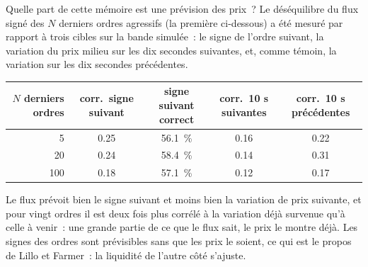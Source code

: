 Quelle part de cette mémoire est une prévision des prix~? Le déséquilibre du flux signé des $N$ derniers ordres agressifs (la première  ci-dessous) a été
mesuré par rapport à trois cibles sur la bande simulée~: le signe de l'ordre suivant, la variation du prix milieu sur les dix secondes suivantes, et, comme
témoin, la variation sur les dix secondes précédentes.

\begin{center}
\small
\begin{tabular}{@{}rcccc@{}}
\toprule
$N$ derniers ordres & corr.\ signe suivant & signe suivant correct & corr.\ 10 s suivantes & corr.\ 10 s précédentes\\
\midrule
5 & 0.25 & 56.1~\% & 0.16 & 0.22\\
20 & 0.24 & 58.4~\% & 0.14 & 0.31\\
100 & 0.18 & 57.1~\% & 0.12 & 0.17\\
\bottomrule
\end{tabular}
\end{center}

Le flux prévoit bien le signe suivant et moins bien la variation de prix suivante, et pour vingt ordres il est deux fois plus corrélé à la
variation déjà survenue qu'à celle à venir~: une grande partie de ce que le flux sait, le prix le montre déjà. Les signes des ordres sont
prévisibles sans que les prix le soient, ce qui est le propos de Lillo et Farmer~: la liquidité de l'autre côté s'ajuste.

\begin{omfigure}

\label{fig:rs:trade-flow-features:acf}
\end{omfigure}

